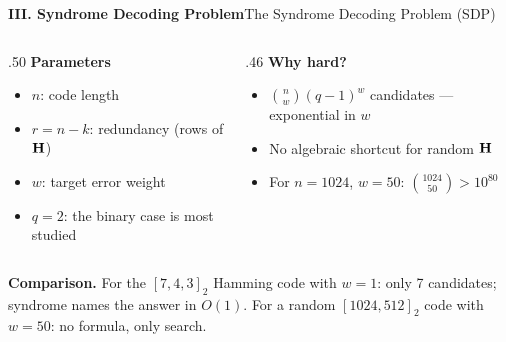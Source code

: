 \begin{frame}{\textbf{III. Syndrome Decoding Problem}}{The Syndrome Decoding Problem (SDP)}
\begin{columns}[T,onlytextwidth]
\begin{column}{.50\textwidth}
\textcolor{TealDarkCyan}{\textbf{Parameters}}
\begin{itemize}
  \item $n$: code length
  \item $r=n-k$: redundancy (rows of $\mathbf{H}$)
  \item $w$: target error weight
  \item $q=2$: the binary case is most studied
\end{itemize}
\end{column}
\begin{column}{.46\textwidth}
\textcolor{TealDarkCyan}{\textbf{Why hard?}}
\begin{itemize}
  \item $\binom{n}{w}(q-1)^w$ candidates — exponential in $w$
  \item No algebraic shortcut for random $\mathbf{H}$
  \item For $n=1024$, $w=50$: $\binom{1024}{50}>10^{80}$
\end{itemize}
\end{column}
\end{columns}
\medskip
\textbf{Comparison.}\; For the $[7,4,3]_2$ Hamming code with $w=1$: only 7 candidates; syndrome names the answer in $O(1)$.
For a random $[1024,512]_2$ code with $w=50$: no formula, only search.
\end{frame}

